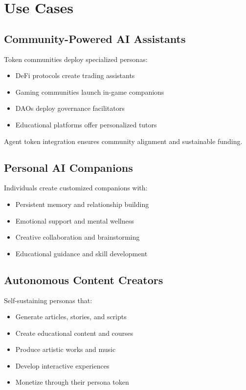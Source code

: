 \documentclass{article}
\begin{document}
\section{Use Cases}

\subsection{Community-Powered AI Assistants}

Token communities deploy specialized personas:
\begin{itemize}
    \item DeFi protocols create trading assistants
    \item Gaming communities launch in-game companions
    \item DAOs deploy governance facilitators
    \item Educational platforms offer personalized tutors
\end{itemize}

Agent token integration ensures community alignment and sustainable funding.

\subsection{Personal AI Companions}

Individuals create customized companions with:
\begin{itemize}
    \item Persistent memory and relationship building
    \item Emotional support and mental wellness
    \item Creative collaboration and brainstorming
    \item Educational guidance and skill development
\end{itemize}

\subsection{Autonomous Content Creators}

Self-sustaining personas that:
\begin{itemize}
    \item Generate articles, stories, and scripts
    \item Create educational content and courses
    \item Produce artistic works and music
    \item Develop interactive experiences
    \item Monetize through their persona token
\end{itemize}
\end{document}
